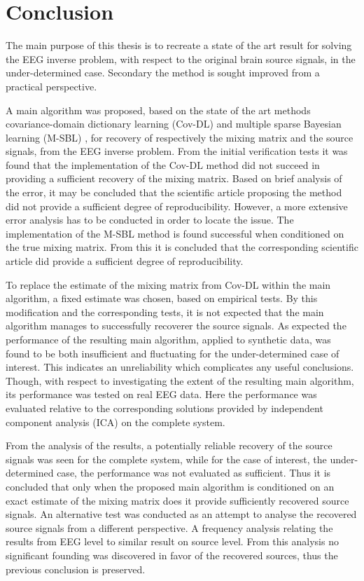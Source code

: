\chapter{Conclusion}
The main purpose of this thesis is to recreate a state of the art result for solving the EEG inverse problem, with respect to the original brain source signals, in the under-determined case.
Secondary the method is sought improved from a practical perspective.

A main algorithm was proposed, based on the state of the art methods covariance-domain dictionary learning (Cov-DL) \cite{Balkan2015} and multiple sparse Bayesian learning (M-SBL) \cite{Balkan2014}, for recovery of respectively the mixing matrix and the source signals, from the EEG inverse problem. 
From the initial verification tests it was found that the implementation of the Cov-DL method did not succeed in providing a sufficient recovery of the mixing matrix. Based on brief analysis of the error, it may be concluded that the scientific article proposing the method did not provide a sufficient degree of reproducibility. However, a more extensive error analysis has to be conducted in order to locate the issue.  
The implementation of the M-SBL method is found successful when conditioned on the true mixing matrix. From this it is concluded that the corresponding scientific article did provide a sufficient degree of reproducibility. 

To replace the estimate of the mixing matrix from Cov-DL within the main algorithm, a fixed estimate was chosen, based on empirical tests.
By this modification and the corresponding tests, it is not expected that the main algorithm manages to successfully recoverer the source signals. As expected the performance of the resulting main algorithm, applied to synthetic data, was found to be both insufficient and fluctuating for the under-determined case of interest. This indicates an unreliability which complicates any useful conclusions. 
Though, with respect to investigating the extent of the resulting main algorithm, its performance was tested on real EEG data. Here the performance was evaluated relative to the corresponding solutions provided by independent component analysis (ICA) on the complete system. 

From the analysis of the results, a potentially reliable recovery of the source signals was seen for the complete system, while for the case of interest, the under-determined case, the performance was not evaluated as sufficient. Thus it is concluded that only when the proposed main algorithm is conditioned on an exact estimate of the mixing matrix does it provide sufficiently recovered source signals.  
An alternative test was conducted as an attempt to analyse the recovered source signals from a different perspective. A frequency analysis relating the results from EEG level to similar result on source level.
From this analysis no significant founding was discovered in favor of the recovered sources, thus the previous conclusion is preserved. 

